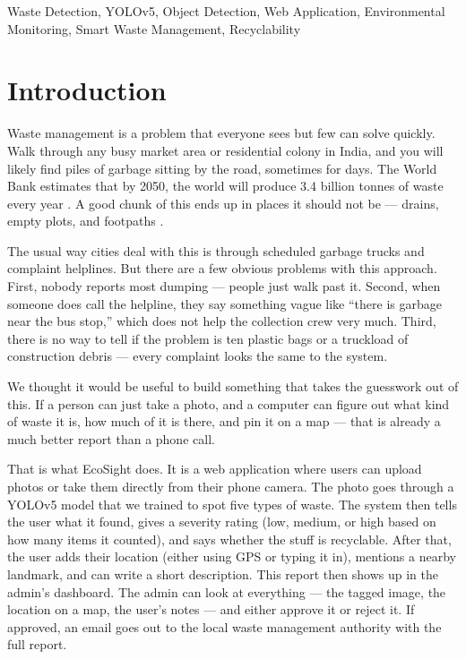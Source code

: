 \documentclass[conference]{IEEEtran}
\begin{document}
\begin{IEEEkeywords}
Waste Detection, YOLOv5, Object Detection, Web Application, Environmental Monitoring, Smart Waste Management, Recyclability
\end{IEEEkeywords}

\section{Introduction}

Waste management is a problem that everyone sees but few can solve quickly. Walk through any busy market area or residential colony in India, and you will likely find piles of garbage sitting by the road, sometimes for days. The World Bank estimates that by 2050, the world will produce 3.4 billion tonnes of waste every year \cite{worldbank2018}. A good chunk of this ends up in places it should not be — drains, empty plots, and footpaths \cite{kaza2018what}.

The usual way cities deal with this is through scheduled garbage trucks and complaint helplines. But there are a few obvious problems with this approach. First, nobody reports most dumping — people just walk past it. Second, when someone does call the helpline, they say something vague like ``there is garbage near the bus stop,'' which does not help the collection crew very much. Third, there is no way to tell if the problem is ten plastic bags or a truckload of construction debris — every complaint looks the same to the system.

We thought it would be useful to build something that takes the guesswork out of this. If a person can just take a photo, and a computer can figure out what kind of waste it is, how much of it is there, and pin it on a map — that is already a much better report than a phone call.

That is what EcoSight does. It is a web application where users can upload photos or take them directly from their phone camera. The photo goes through a YOLOv5 model that we trained to spot five types of waste. The system then tells the user what it found, gives a severity rating (low, medium, or high based on how many items it counted), and says whether the stuff is recyclable. After that, the user adds their location (either using GPS or typing it in), mentions a nearby landmark, and can write a short description. This report then shows up in the admin's dashboard. The admin can look at everything — the tagged image, the location on a map, the user's notes — and either approve it or reject it. If approved, an email goes out to the local waste management authority with the full report.
\end{document}
